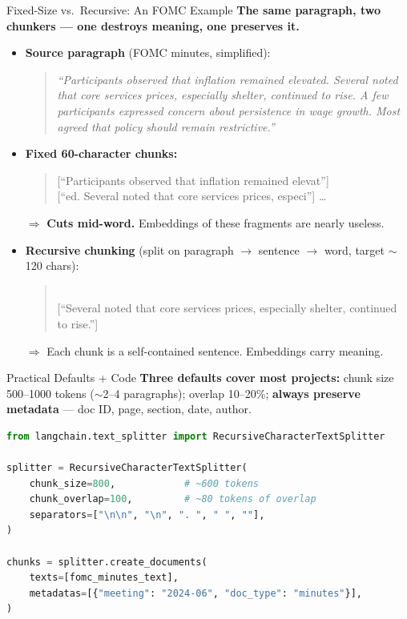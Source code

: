 \begin{frame}{Fixed-Size vs.\ Recursive: An FOMC Example}
\textbf{The same paragraph, two chunkers --- one destroys meaning, one preserves it.}

\smallskip
\begin{itemize}
\item \textbf{Source paragraph} (FOMC minutes, simplified):
\begin{quote}
\small\itshape
``Participants observed that inflation remained elevated. Several noted that core services prices, especially shelter, continued to rise. A few participants expressed concern about persistence in wage growth. Most agreed that policy should remain restrictive.''
\end{quote}

\smallskip
\item \textbf{Fixed 60-character chunks:}
\begin{quote}
\small\ttfamily
{[}``Participants observed that inflation remained elevat''] \\
{[}``ed. Several noted that core services prices, especi''] \dots
\end{quote}
$\Rightarrow$ \textbf{Cuts mid-word.} Embeddings of these fragments are nearly useless.

\smallskip
\item \textbf{Recursive chunking} (split on paragraph $\to$ sentence $\to$ word, target $\sim$120 chars):
\begin{quote}
\small{} \\
{[}``Several noted that core services prices, especially shelter, continued to rise.'']
\end{quote}
$\Rightarrow$ Each chunk is a self-contained sentence. Embeddings carry meaning.
\end{itemize}
\end{frame}

\begin{frame}[fragile]{Practical Defaults + Code}
\textbf{Three defaults cover most projects:} chunk size 500--1000 tokens ($\sim$2--4 paragraphs); overlap 10--20\%; \textbf{always preserve metadata} --- doc ID, page, section, date, author.

\smallskip
\begin{lstlisting}[language=Python]
from langchain.text_splitter import RecursiveCharacterTextSplitter

splitter = RecursiveCharacterTextSplitter(
    chunk_size=800,            # ~600 tokens
    chunk_overlap=100,         # ~80 tokens of overlap
    separators=["\n\n", "\n", ". ", " ", ""],
)

chunks = splitter.create_documents(
    texts=[fomc_minutes_text],
    metadatas=[{"meeting": "2024-06", "doc_type": "minutes"}],
)
\end{lstlisting}
\end{frame}

